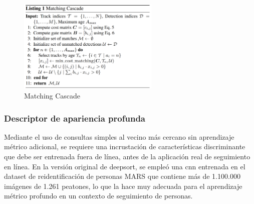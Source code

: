 \begin{figure}[ht]
\centering
\includegraphics[width=0.6\textwidth]{img/chapters/estado-del-arte/matching-cascade.png}
\caption{\label{fig:matching-cascade}Matching Cascade \cite{Wojke2017simple}}
\end{figure}

\subsubsection*{Descriptor de apariencia profunda}
\label{subsubsec:deep-appearance-descriptor}

Mediante el uso de consultas simples al vecino más cercano sin aprendizaje métrico adicional, se requiere una incrustación de características discriminante que debe ser entrenada fuera de línea, antes de la aplicación real de seguimiento en línea. En la versión original de \gls{deepsort}, se empleó una \gls{cnn} entrenada en el dataset de reidentificación de personas MARS \cite{10.1007/978-3-319-46466-4_52} que contiene más de 1.100.000 imágenes de 1.261 peatones, lo que la hace muy adecuada para el aprendizaje métrico profundo en un contexto de seguimiento de personas.

